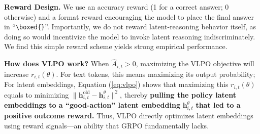 \textbf{Reward Design.} We use an accuracy reward (1 for a correct answer; 0 otherwise) and a format reward encouraging the model to place the final answer in ``\verb|\boxed{}|''. Importantly, we do not reward latent-reasoning behavior itself, as doing so would incentivize the model to invoke latent reasoning indiscriminately. We find this simple reward scheme yields strong empirical performance.

\textbf{How does VLPO work?} When $\hat{A}_{i, t}>0$, maximizing the VLPO objective will increase $r_{i,t}(\theta)$. For text tokens, this means maximizing its output probability; For latent embeddings, Equation (\ref{eq:vlpo}) shows that maximizing this $r_{i,t}(\theta)$ equals to minimizing $\|\mathbf{h}^{\text{old}}_{i,t}-\mathbf{h}^{\theta}_{i,t}\|^2$, thereby \textbf{pulling the policy latent embeddings to a ``good-action'' latent embedding} $\mathbf{h}^{\theta}_{i,t}$ \textbf{that led to a positive outcome reward.} Thus, VLPO directly optimizes latent embeddings using reward signals—an ability that GRPO fundamentally lacks.